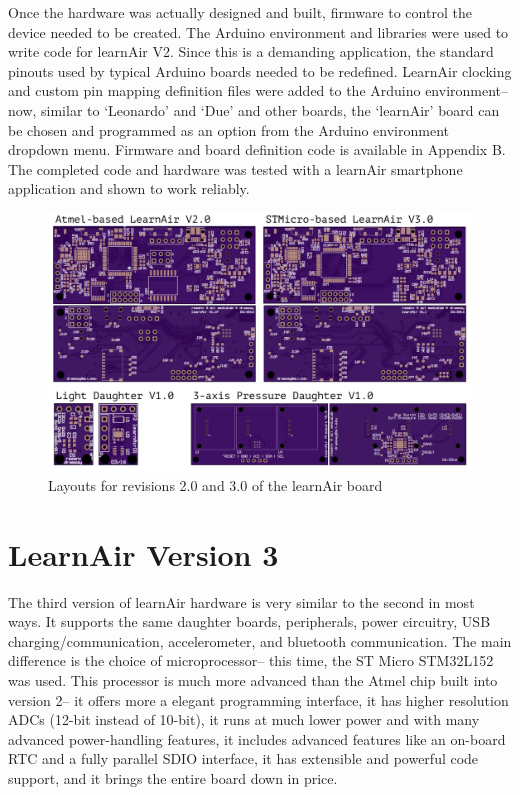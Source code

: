 Once the hardware was actually designed and built, firmware to control the device needed to be created.  The Arduino environment and libraries were used to write code for learnAir V2.  Since this is a demanding application, the standard pinouts used by typical Arduino boards needed to be redefined.  LearnAir clocking and custom pin mapping definition files were added to the Arduino environment-- now, similar to `Leonardo' and `Due' and other boards, the `learnAir' board can be chosen and programmed as an option from the Arduino environment dropdown menu.  Firmware and board definition code is available in Appendix B.  The completed code and hardware was tested with a learnAir smartphone application and shown to work reliably.

\FloatBarrier

\begin{figure}[htb]
 	\includegraphics[width=\textwidth]{visuals/layouts}               
 	 \caption{Layouts for revisions 2.0 and 3.0 of the learnAir board}
  	\label{fig:layouts}
\end{figure}


\FloatBarrier
\section{LearnAir Version 3}
\FloatBarrier

The third version of learnAir hardware is very similar to the second in most ways.  It supports the same daughter boards, peripherals, power circuitry, USB charging/communication, accelerometer, and bluetooth communication.  The main difference is the choice of microprocessor-- this time, the ST Micro STM32L152 was used.  This processor is much more advanced than the Atmel chip built into version 2-- it offers more a elegant programming interface, it has higher resolution ADCs (12-bit instead of 10-bit), it runs at much lower power and with many advanced power-handling features, it includes advanced features like an on-board RTC and a fully parallel SDIO interface, it has extensible and powerful code support, and it brings the entire board down in price.  

